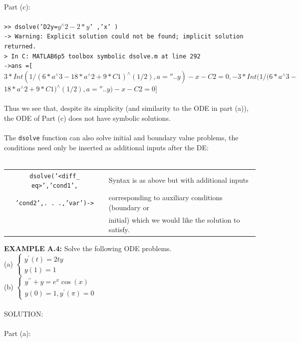\documentclass[../main.tex]{subfiles}
\begin{document}
\\
 Part (c): \\
 \\
\texttt{>> dsolve('D2y=$y^{\wedge}2-2*y$' ,'x' ) }\\
\texttt{-> Warning: Explicit solution could not be found; implicit solution returned.}\\
\texttt{> In C:\ MATLAB6p5\ toolbox\ symbolic\ dsolve.m at line 292 }\\
\texttt{->ans =[ $3*Int(1/(6*a^{\wedge}3-18*a^{\wedge}2+9*C1)^{\wedge}(1/2),a=''..y)-x-C2=0, -3*Int(1/(6*a^{\wedge}3-$}
\texttt{$18*a^{\wedge}2+9*C1)^{\wedge}(1/2),a=''..y)-x-C2=0] $}\\
\\
Thus we see that, despite its simplicity (and similarity to the ODE in part (a)), the 
ODE of Part (c) does not have symbolic solutions. 
\\
\\
The \texttt{dsolve} function can also solve initial and boundary value problems, the 
conditions need only be inserted as additional inputs after the DE:
\\
\\
\begin{center}
\begin{tabular}{|c|l|}
\hline
\texttt{dsolve('<diff\_ eq>','cond1',}&Syntax is as above but with additional inputs \\
\texttt{'cond2',. . .,'var')->}&corresponding to auxiliary conditions (boundary or\\
&initial) which we would like the solution to satisfy.\\
\hline
\end{tabular}
\end{center}
\textbf{EXAMPLE A.4:} Solve the following ODE problems.\\
(a) $\left\{\begin{array}{l}y^{\prime}(t)=2 t y \\ y(1)=1\end{array}\right.$\\
(b) $\left\{\begin{array}{l}y^{\prime \prime}+y=e^{x} \cos (x) \\ y(0)=1, y^{\prime}(\pi)=0\end{array}\right.$
\\
\\
SOLUTION:
\\
\\
Part (a): 
\\
\end{document}
